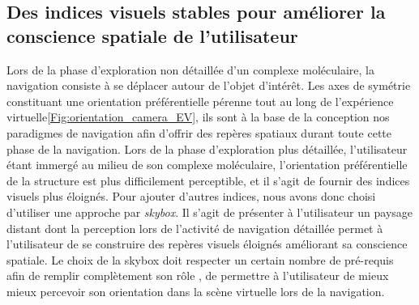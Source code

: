  


\subsection{Des indices visuels stables pour améliorer la conscience spatiale de l'utilisateur}




Lors de la phase d'exploration non détaillée d'un complexe moléculaire, la navigation consiste à se déplacer autour de l'objet d'intérêt. Les axes de symétrie constituant une orientation préférentielle pérenne tout au long de l'expérience virtuelle\ref{Fig:orientation_camera_EV}, ils sont à la base de la conception nos paradigmes de navigation afin d'offrir des repères spatiaux durant toute cette phase de la navigation. Lors de la phase d'exploration plus détaillée, l'utilisateur étant immergé au milieu de son complexe moléculaire, l'orientation préférentielle de la structure est plus difficilement perceptible, et il s'agit de fournir des indices visuels plus éloignés. Pour ajouter d'autres indices, nous avons donc choisi d'utiliser une approche par \textit{skybox}. Il s'agit de présenter à l'utilisateur un paysage distant  dont la perception lors de l'activité de navigation détaillée permet à l'utilisateur de se construire des repères visuels éloignés améliorant sa conscience spatiale. Le choix de la skybox doit respecter un certain nombre de pré-requis afin de remplir complètement son rôle \cite{vinson_design_1999}, de permettre à l'utilisateur de mieux mieux percevoir son orientation dans la scène virtuelle lors de la navigation. %

